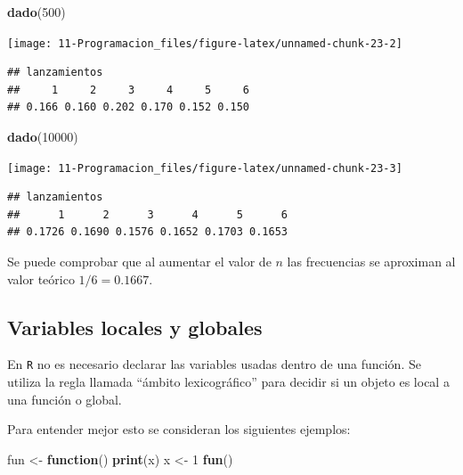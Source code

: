 \documentclass[]{book}
\newenvironment{Shaded}{\begin{snugshade}}{\end{snugshade}}
\newcommand{\KeywordTok}[1]{\textcolor[rgb]{0.13,0.29,0.53}{\textbf{#1}}}
\newcommand{\DecValTok}[1]{\textcolor[rgb]{0.00,0.00,0.81}{#1}}
\newcommand{\StringTok}[1]{\textcolor[rgb]{0.31,0.60,0.02}{#1}}
\newcommand{\ControlFlowTok}[1]{\textcolor[rgb]{0.13,0.29,0.53}{\textbf{#1}}}
\newcommand{\NormalTok}[1]{#1}
\begin{document}
\begin{Shaded}
\begin{Highlighting}[]
\KeywordTok{dado}\NormalTok{(}\DecValTok{500}\NormalTok{)}
\end{Highlighting}
\end{Shaded}

\begin{center}\texttt{[image: 11-Programacion\_files/figure-latex/unnamed-chunk-23-2]} \end{center}

\begin{verbatim}
## lanzamientos
##     1     2     3     4     5     6 
## 0.166 0.160 0.202 0.170 0.152 0.150
\end{verbatim}

\begin{Shaded}
\begin{Highlighting}[]
\KeywordTok{dado}\NormalTok{(}\DecValTok{10000}\NormalTok{)}
\end{Highlighting}
\end{Shaded}

\begin{center}\texttt{[image: 11-Programacion\_files/figure-latex/unnamed-chunk-23-3]} \end{center}

\begin{verbatim}
## lanzamientos
##      1      2      3      4      5      6 
## 0.1726 0.1690 0.1576 0.1652 0.1703 0.1653
\end{verbatim}

Se puede comprobar que al aumentar el valor de \(n\) las frecuencias se
aproximan al valor teórico \(1/6=0.1667\).

\subsection{Variables locales y
globales}\label{variables-locales-y-globales}

En \texttt{R} no es necesario declarar las variables usadas dentro de
una función. Se utiliza la regla llamada ``ámbito lexicográfico'' para
decidir si un objeto es local a una función o global.

Para entender mejor esto se consideran los siguientes ejemplos:

\begin{Shaded}
\begin{Highlighting}[]
\NormalTok{fun <-}\StringTok{ }\ControlFlowTok{function}\NormalTok{() }\KeywordTok{print}\NormalTok{(x)}
\NormalTok{x <-}\StringTok{ }\DecValTok{1}
\KeywordTok{fun}\NormalTok{()}
\end{Highlighting}
\end{Shaded}
\end{document}
